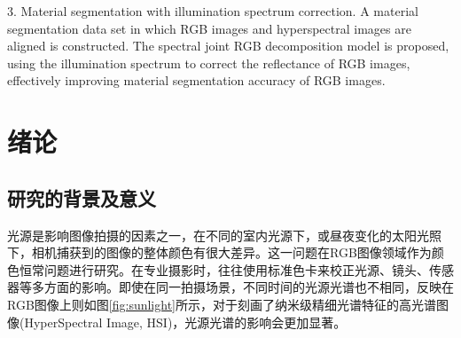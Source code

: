 \documentclass[
    type = master, %
    degree = academic,        %
    decl-page,  %
  ]{njuthesis}
\begin{document}
\begin{abstract*}
3. Material segmentation with illumination spectrum correction. A material segmentation data set in which RGB images and hyperspectral images are aligned is constructed. The spectral joint RGB decomposition model is proposed, using the illumination spectrum to correct the reflectance of RGB images, effectively improving material segmentation accuracy of RGB images.
\end{abstract*}

\tableofcontents
{}

\mainmatter


%   
%   

\chapter{绪论}
\section{研究的背景及意义}
光源是影响图像拍摄的因素之一，在不同的室内光源下，或昼夜变化的太阳光照下，相机捕获到的图像的整体颜色有很大差异。这一问题在RGB图像领域作为颜色恒常问题\cite{gijsenij2011computational,RN30,RN14,RN13,RN9,RN8}进行研究。在专业摄影时，往往使用标准色卡来校正光源、镜头、传感器等多方面的影响。即使在同一拍摄场景，不同时间的光源光谱也不相同，反映在RGB图像上则如图\ref{fig:sunlight}所示，对于刻画了纳米级精细光谱特征的高光谱图像(HyperSpectral Image, HSI)，光源光谱的影响会更加显著。
\end{document}
